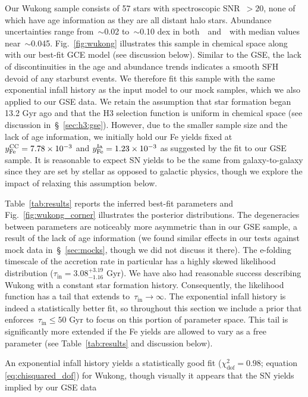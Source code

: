 \documentclass[ms.tex]{subfiles}
\begin{document}
Our Wukong sample consists of 57 stars with spectroscopic SNR~$> 20$, none of
which have age information as they are all distant halo stars.
Abundance uncertainties range from~$\sim$0.02 to~$\sim$0.10 dex in
both~\afe~and~\feh~with median values near~$\sim$0.045.
Fig.~\ref{fig:wukong} illustrates this sample in chemical space along with our
best-fit GCE model (see discussion below).
Similar to the GSE, the lack of discontinuities in the age and abundance trends
indicates a smooth SFH devoid of any starburst events.
We therefore fit this sample with the same exponential infall history as the
input model to our mock samples, which we also applied to our GSE data.
We retain the assumption that star formation began 13.2 Gyr ago and that the H3
selection function is uniform in chemical space (see discussion
in~\S~\ref{sec:h3:gse}).
However, due to the smaller sample size and the lack of age information, we
initially hold our Fe yields fixed at~$y_\text{Fe}^\text{CC} = 7.78\times10^{-3}$ and
$y_\text{Fe}^\text{Ia} = 1.23\times10^{-3}$ as suggested by the fit to our GSE sample.
It is reasonable to expect SN yields to be the same from galaxy-to-galaxy since
they are set by stellar as opposed to galactic physics, though we explore the
impact of relaxing this assumption below.
\par
Table~\ref{tab:results} reports the inferred best-fit parameters and
Fig.~\ref{fig:wukong_corner} illustrates the posterior distributions.
The degeneracies between parameters are noticeably more asymmetric than in our
GSE sample, a result of the lack of age information (we found similar effects
in our tests against mock data in~\S~\ref{sec:mocks}, though we did not discuss
it there).
The e-folding timescale of the accretion rate in particular has a highly skewed
likelihood distribution ($\tau_\text{in} = 3.08^{+3.19}_{-1.16}$ Gyr).
We have also had reasonable success describing Wukong with a constant star
formation history.
Consequently, the likelihood function has a tail that extends
to~$\tau_\text{in} \rightarrow \infty$.
The exponential infall history is indeed a statistically better fit, so
throughout this section we include a prior that
enforces~$\tau_\text{in} \leq 50$ Gyr to focus on this portion of parameter
space.
This tail is significantly more extended if the Fe yields are allowed to vary
as a free parameter (see Table~\ref{tab:results} and discussion below).
\par
An exponential infall history yields a statistically good fit
($\chi_\text{dof}^2 = 0.98$; equation \ref{eq:chisquared_dof}) for Wukong,
though visually it appears that the SN yields implied by our GSE data
\end{document}
